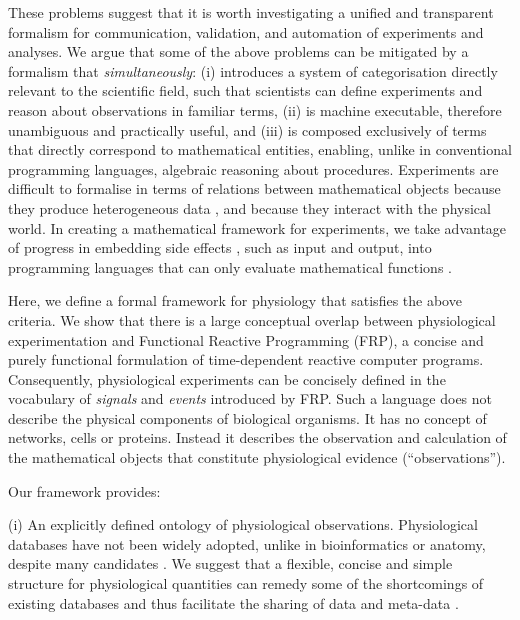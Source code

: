 These problems suggest that it is worth investigating a
unified and transparent formalism for communication, validation, and
automation of experiments and analyses. We argue that
some of the above problems can be mitigated by a formalism that
\emph{simultaneously}: (i) introduces a system of categorisation
directly relevant to the scientific field, such that scientists can
define experiments and reason about observations in familiar terms,
(ii) is machine executable, therefore unambiguous and practically
useful, and (iii) is composed exclusively of terms that directly
correspond to mathematical entities, enabling, unlike in conventional
programming languages, algebraic reasoning about procedures.
Experiments are difficult to formalise in terms of relations between
mathematical objects because they produce heterogeneous data
\cite{Tukey1962}, and because they interact with the physical
world. In creating a mathematical framework for experiments, we take
advantage of progress in embedding side effects \cite{PeytonJones2002,
  Roy2004, Wadler1995}, such as input and output, into programming
languages that can only evaluate mathematical functions
\cite{Church1941}.

Here, we define a formal framework for physiology
that satisfies the above criteria. We show that there
is a large conceptual overlap between physiological experimentation
and Functional Reactive Programming (FRP\cite{Elliott1997,
  Nilsson2002}), a concise and purely functional formulation of
time-dependent reactive computer programs. Consequently, physiological
experiments can be concisely defined in the vocabulary of
\emph{signals} and \emph{events} introduced by FRP. Such a language
does not describe the physical components of biological organisms. It
has no concept of networks, cells or proteins. Instead it describes
the observation and calculation of the mathematical objects that
constitute physiological evidence (``observations'').

Our framework provides:

(i) An explicitly defined ontology of physiological
observations. Physiological databases have not been widely
adopted\cite{Herz2008, Amari2002}, unlike in bioinformatics or
anatomy, despite many candidates \cite{Jessop2010, Teeters2008,
  Frishkoff2009, Katz2010}.  We suggest that a flexible, concise and
simple structure for physiological quantities can remedy some of the
shortcomings\cite{Gardner2005, Amari2002} of existing databases and
thus facilitate the sharing of data and meta-data \cite{Insel2003}.

